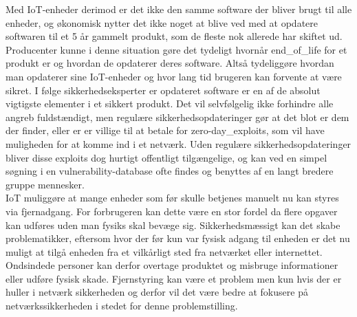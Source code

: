     Med IoT-enheder derimod er det ikke den samme software der bliver brugt til alle enheder, og økonomisk nytter det ikke noget at blive ved med at opdatere softwaren til et 5 år gammelt produkt, som de fleste nok allerede har skiftet ud.
    Producenter kunne i denne situation gøre det tydeligt hvornår \gls{end_of_life} for et produkt er og hvordan de opdaterer deres software. Altså tydeliggøre hvordan man opdaterer sine IoT-enheder og hvor lang tid brugeren kan forvente at være sikret. I følge sikkerhedseksperter er opdateret software er en af de absolut vigtigste elementer i et sikkert produkt. \autocite{soups2015}
    Det vil selvfølgelig ikke forhindre alle angreb fuldstændigt, men regulære sikkerhedsopdateringer gør at det blot er dem der finder, eller er er villige til at betale for \glspl{zero-day_exploit}, som vil have muligheden for at komme ind i et netværk. Uden regulære sikkerhedsopdateringer bliver disse exploits dog hurtigt offentligt tilgængelige, og kan ved en simpel søgning i en \gls{vulnerability-database} ofte findes og benyttes af en langt bredere gruppe mennesker.\\
    IoT muliggøre at mange enheder som før skulle betjenes manuelt nu kan styres via fjernadgang. For forbrugeren kan dette være en stor fordel da flere opgaver kan udføres uden man fysiks skal bevæge sig. Sikkerhedsmæssigt kan det skabe problematikker, eftersom hvor der før kun var fysisk adgang til enheden er det nu muligt at tilgå enheden fra et vilkårligt sted fra netværket eller internettet.\\ 
    Ondsindede personer kan derfor overtage produktet og misbruge informationer eller udføre fysisk skade. Fjernstyring kan være et problem men kun hvis der er huller i netværk sikkerheden og derfor vil det være bedre at fokusere på netværkssikkerheden i stedet for denne problemstilling.\autocite{Forbes2017}\\
